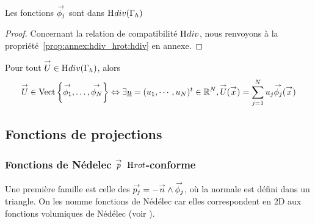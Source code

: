       \begin{prop}
        Les fonctions \({\overset{\rightarrow}{\phi_j}}\) sont dans \(\mathrm{H}_\mathrm{{}}{div}(\Gamma_h)\)
      \end{prop}
      \begin{proof}
        Concernant la relation de compatibilité \(\mathrm{H}_\mathrm{{}}{div}\), nous renvoyons à la propriété~\ref{prop:annex:hdiv_hrot:hdiv} en annexe.
      \end{proof}

      \begin{defn}
        Pour tout \({\overset{\rightarrow}{U}} \in \mathrm{H}_\mathrm{{}}{div}(\Gamma_h)\), alors 
        \begin{equation*}
          {\overset{\rightarrow}{U}} \in \operatorname{Vect}\left\lbrace{\overset{\rightarrow}{\phi_1}},\ldots,{\overset{\rightarrow}{\phi_N}}\right\rbrace \Leftrightarrow \exists {\underline{u}} = (u_1,\cdots,u_N)^t \in \mathbb R^N, {\overset{\rightarrow}{U}}({\overset{\rightarrow}{x}}) = \sum_{j=1}^N u_j {\overset{\rightarrow}{\phi_j}}({\overset{\rightarrow}{x}})
        \end{equation*}
      \end{defn}

  \subsection{Fonctions de projections}


    \subsubsection[Fonctions de Nédélec p Hrot-conforme]{Fonctions de Nédelec \({\overset{\rightarrow}{p}}\) \(\mathrm{H}_\mathrm{{}}{rot}\)-conforme}
    
      Une première famille est celle des \({\overset{\rightarrow}{p_j}}=-{\overset{\rightarrow}{n}}\wedge{\overset{\rightarrow}{\phi_j}}\), où la normale est défini dans un triangle. On les nomme fonctions de Nédélec car elles correspondent en 2D aux fonctions volumiques de Nédélec (voir \cite{nedelec_mixed_1980}).

